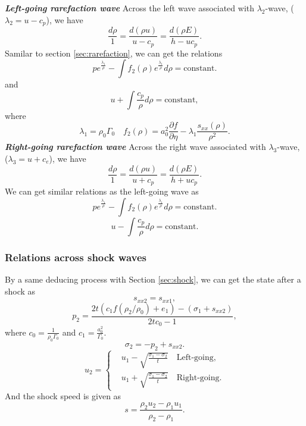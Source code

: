 \documentclass[review]{elsarticle}
\begin{document}
\emph{\textbf{Left-going rarefaction wave} }
Across the left wave associated with $\lambda_2$-wave, ($\lambda_2=u-c_p$), we have
\begin{equation}
  \frac{d\rho}{1} = \frac{d(\rho u)}{u-c_p} = \frac{d(\rho E)}{h-uc_p}.
\end{equation}
Samilar to section \ref{sec:rarefaction}, we can get the relations
\begin{equation}\label{eq:p_rhop}
  p e^{\frac{\lambda_1}{\rho}} - \int f_2(\rho) e^{\frac{\lambda_1}{\rho}}d\rho = \text{constant}.
\end{equation}
and
\begin{equation}
  u+\int\frac{c_p}{\rho} d\rho = \text{constant},
\end{equation}
where
\begin{equation}
  \lambda_1 = \rho_0 \Gamma_0 \quad f_2(\rho) = a_0^2\frac{\partial f}{\partial \eta}- \lambda_1\frac{s_{xx}(\rho)}{\rho^2}.
\end{equation}
\emph{\textbf{Right-going rarefaction wave} }
Across the right wave associated with $\lambda_3$-wave, ($\lambda_3=u+c_e$), we have
\begin{equation}
  \frac{d\rho}{1} = \frac{d(\rho u)}{u+c_p} = \frac{d(\rho E)}{h+uc_p}.
\end{equation}
We can get  similar  relations  as the left-going wave as
\begin{equation}
  p e^{\frac{\lambda_1}{\rho}} - \int f_2(\rho) e^{\frac{\lambda_1}{\rho}}d\rho = \text{constant}.
\end{equation}
\begin{equation}
  u-\int\frac{c_p}{\rho} d\rho = \text{constant}.
\end{equation}
\subsubsection{Relations across  shock waves}\label{sec:shockp}
By a same deducing process with Section \ref{sec:shock}, we can get the state after a shock as  
\begin{equation}
  s_{xx2} = s_{xx1},
\end{equation}
\begin{equation}\label{eq:shockp}
  p_2= \frac{2t(c_1f(\rho_2/\rho_0)+e_1)-(\sigma_1+s_{xx2})}{2tc_0-1},
\end{equation}
where $c_0 = \frac{1}{\rho_0\Gamma_0}$ and $c_1 = \frac{a_0^2}{\Gamma_0}$.
\begin{equation}
  \sigma_2 = -p_2 +s_{xx2}.
\end{equation}
\begin{equation}\label{eq:shockup}
  u_2 = \left\{ \begin{aligned}
	 & u_1 - \sqrt{\frac{\sigma_1- \sigma_2}{t}} \quad \text{Left-going}, \\
	 & u_1 + \sqrt{\frac{\sigma_1- \sigma_2}{t}} \quad \text{Right-going}.
	\end{aligned}
	\right.
  \end{equation}
And the shock speed is given as 
\begin{equation}
  s = \frac{\rho_2u_2-\rho_1u_1}{\rho_2-\rho_1}.
\end{equation}
\end{document}
